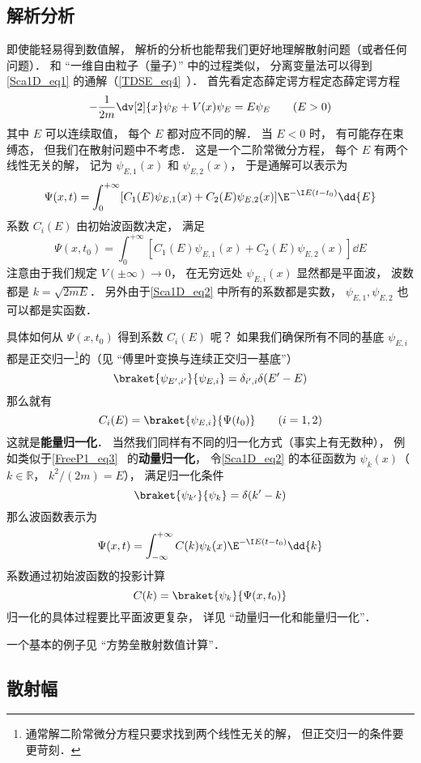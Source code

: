 \subsection{解析分析}
即使能轻易得到数值解， 解析的分析也能帮我们更好地理解散射问题（或者任何问题）． 和 “一维自由粒子（量子）” 中的过程类似， 分离变量法可以得到\autoref{Sca1D_eq1} 的通解（\autoref{TDSE_eq4}~）． 首先看定态薛定谔方程定态薛定谔方程
\begin{equation}\label{Sca1D_eq2}
-\frac{1}{2m}\dv[2]{x}\psi_E + V(x) \psi_E = E \psi_E \qquad (E > 0)
\end{equation}
其中 $E$ 可以连续取值， 每个 $E$ 都对应不同的解． 当 $E< 0$ 时， 有可能存在束缚态， 但我们在散射问题中不考虑． 这是一个二阶常微分方程， 每个 $E$ 有两个线性无关的解， 记为 $\psi_{E,1}(x)$ 和 $\psi_{E,2}(x)$， 于是通解可以表示为
\begin{equation}
\Psi(x, t) = \int_0^{+\infty} [C_1(E) \psi_{E,1}(x) + C_2(E) \psi_{E,2}(x)] \E^{-\I E (t-t_0)} \dd{E}
\end{equation}
系数 $C_i(E)$ 由初始波函数决定， 满足
\begin{equation}
\Psi(x, t_0) = \int_0^{+\infty} [C_1(E) \psi_{E,1}(x) + C_2(E) \psi_{E,2}(x)] \dd{E}
\end{equation}
注意由于我们规定 $V(\pm\infty)\to 0$， 在无穷远处 $\psi_{E,i}(x)$ 显然都是平面波， 波数都是 $k = \sqrt{2mE}$． 另外由于\autoref{Sca1D_eq2} 中所有的系数都是实数， $\psi_{E,1}, \psi_{E,2}$ 也可以都是实函数．

具体如何从 $\Psi(x, t_0)$ 得到系数 $C_i(E)$ 呢？ 如果我们确保所有不同的基底 $\psi_{E,i}$ 都是正交归一\footnote{通常解二阶常微分方程只要求找到两个线性无关的解， 但正交归一的条件要更苛刻．}的（见 “傅里叶变换与连续正交归一基底”）
\begin{equation}
\braket{\psi_{E',i'}}{\psi_{E,i}} = \delta_{i',i}\delta(E' - E)
\end{equation}
那么就有
\begin{equation}
C_i(E) = \braket{\psi_{E,i}}{\Psi(t_0)} \qquad (i = 1,2)
\end{equation}
这就是\textbf{能量归一化}． 当然我们同样有不同的归一化方式（事实上有无数种）， 例如类似于\autoref{FreeP1_eq3}~ 的\textbf{动量归一化}， 令\autoref{Sca1D_eq2} 的本征函数为 $\psi_{k}(x)$（$k \in \mathbb R$， $k^2/(2m) = E$）， 满足归一化条件
\begin{equation}
\braket{\psi_{k'}}{\psi_{k}} = \delta(k' - k)
\end{equation}
那么波函数表示为
\begin{equation}
\Psi(x, t) = \int_{-\infty}^{+\infty} C(k) \psi_k(x)\E^{-\I E (t-t_0)} \dd{k}
\end{equation}
系数通过初始波函数的投影计算
\begin{equation}
C(k) = \braket{\psi_k}{\Psi(x, t_0)}
\end{equation}
归一化的具体过程要比平面波更复杂， 详见 “动量归一化和能量归一化”．

一个基本的例子见 “方势垒散射数值计算”．

\subsection{散射幅}
